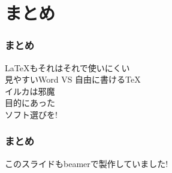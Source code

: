 \documentclass[dvipdfmx]{beamer}
\begin{document}
\section{まとめ}
		\begin{frame}
			\frametitle{まとめ}			
			\LaTeX{}もそれはそれで使いにくい　\\
			見やすいWord VS 自由に書けるTeX\\
			{\color{gray} \small イルカは邪魔}\\
			{\huge 目的にあった\\ソフト選びを!}
		\end{frame}
		\begin{frame}
			\frametitle{まとめ}			
			{\huge このスライドもbeamerで製作していました!}
		\end{frame}
\end{document}
